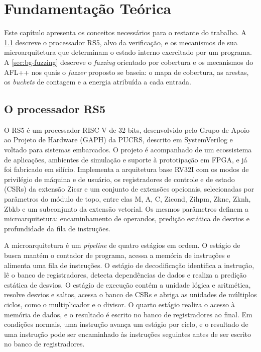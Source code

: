 \chapter{\label{chap:bg}Fundamentação Teórica}

Este capítulo apresenta os conceitos necessários para o restante do trabalho. A \cref{sec:bg-rs5} descreve o processador RS5, alvo da verificação, e os mecanismos de sua microarquitetura que determinam o estado interno exercitado por um programa. A \cref{sec:bg-fuzzing} descreve o \textit{fuzzing} orientado por cobertura e os mecanismos do AFL++ nos quais o \textit{fuzzer} proposto se baseia: o mapa de cobertura, as arestas, os \textit{buckets} de contagem e a energia atribuída a cada entrada.

\section{O processador RS5}\label{sec:bg-rs5}

O RS5 \citep{Nunes:2024:RS5} é um processador RISC-V de 32 bits, desenvolvido pelo Grupo de Apoio ao Projeto de Hardware (GAPH) da PUCRS, descrito em SystemVerilog e voltado para sistemas embarcados. O projeto é acompanhado de um ecossistema de aplicações, ambientes de simulação e suporte à prototipação em FPGA, e já foi fabricado em silício. Implementa a arquitetura base RV32I com os modos de privilégio de máquina e de usuário, os registradores de controle e de estado (CSRs) da extensão Zicsr e um conjunto de extensões opcionais, selecionadas por parâmetros do módulo de topo, entre elas M, A, C, Zicond, Zihpm, Zkne, Zknh, Zbkb e um subconjunto da extensão vetorial. Os mesmos parâmetros definem a microarquitetura: encaminhamento de operandos, predição estática de desvios e profundidade da fila de instruções.

A microarquitetura é um \textit{pipeline} de quatro estágios em ordem. O estágio de busca mantém o contador de programa, acessa a memória de instruções e alimenta uma fila de instruções. O estágio de decodificação identifica a instrução, lê o banco de registradores, detecta dependências de dados e realiza a predição estática de desvios. O estágio de execução contém a unidade lógica e aritmética, resolve desvios e saltos, acessa o banco de CSRs e abriga as unidades de múltiplos ciclos, como o multiplicador e o divisor. O quarto estágio realiza o acesso à memória de dados, e o resultado é escrito no banco de registradores ao final. Em condições normais, uma instrução avança um estágio por ciclo, e o resultado de uma instrução pode ser encaminhado às instruções seguintes antes de ser escrito no banco de registradores.

